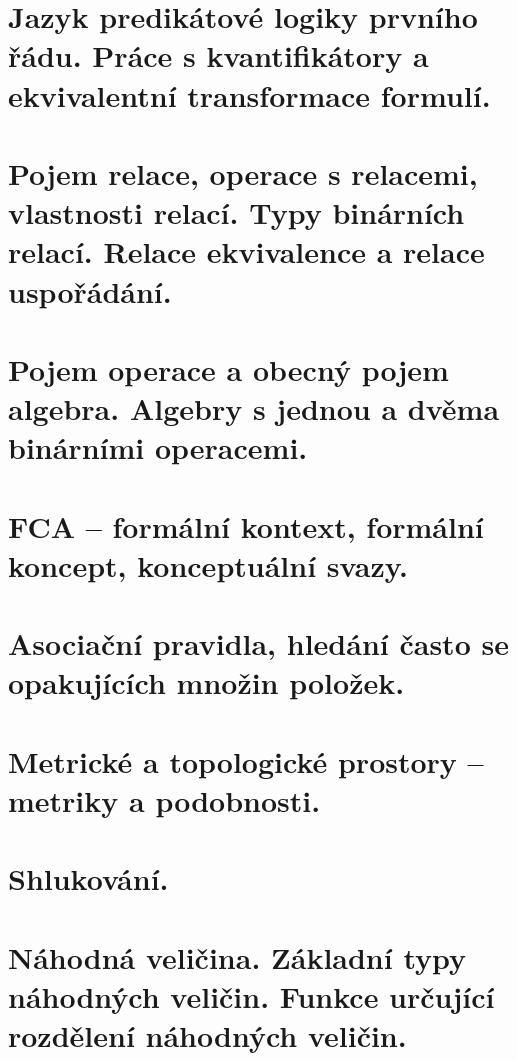 \documentclass[openany]{book}
\begin{document}
\chapter{Jazyk predikátové logiky prvního řádu. Práce s kvantifikátory a ekvivalentní transformace formulí.}


\chapter{Pojem relace, operace s relacemi, vlastnosti relací. Typy binárních relací. Relace ekvivalence a relace uspořádání.}


\chapter{Pojem operace a obecný pojem algebra. Algebry s jednou a dvěma binárními operacemi.}


\chapter{FCA – formální kontext, formální koncept, konceptuální svazy.}


\chapter{Asociační pravidla, hledání často se opakujících množin položek.}


\chapter{Metrické a topologické prostory – metriky a podobnosti.}


\chapter{Shlukování.}


\chapter{Náhodná veličina. Základní typy náhodných veličin. Funkce určující rozdělení náhodných veličin.}

\end{document}

